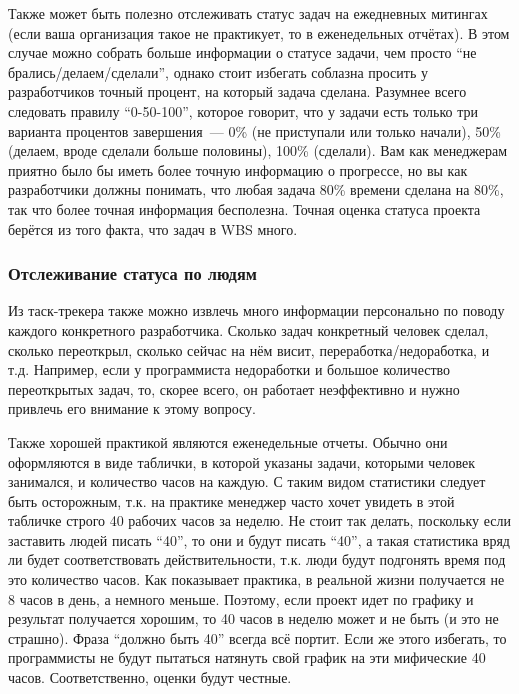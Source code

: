 \documentclass{../../text-style}
\begin{document}
Также может быть полезно отслеживать статус задач на ежедневных митингах (если ваша организация такое не практикует, то в еженедельных отчётах). В этом случае можно собрать больше информации о статусе задачи, чем просто \enquote{не брались/делаем/сделали}, однако стоит избегать соблазна просить у разработчиков точный процент, на который задача сделана. Разумнее всего следовать правилу \enquote{0-50-100}, которое говорит, что у задачи есть только три варианта процентов завершения~--- 0\% (не приступали или только начали), 50\% (делаем, вроде сделали больше половины), 100\% (сделали). Вам как менеджерам приятно было бы иметь более точную информацию о прогрессе, но вы как разработчики должны понимать, что любая задача 80\%  времени сделана на 80\%, так что более точная информация бесполезна. Точная оценка статуса проекта берётся из того факта, что задач в WBS много.

\subsubsection{Отслеживание статуса по людям}

Из таск-трекера также можно извлечь много информации персонально по поводу каждого конкретного разработчика. Сколько задач конкретный человек сделал, сколько переоткрыл, сколько сейчас на нём висит, переработка/недоработка, и т.д. Например, если у программиста недоработки и большое количество переоткрытых задач, то, скорее всего, он работает неэффективно и нужно привлечь его внимание к этому вопросу.

Также хорошей практикой являются еженедельные отчеты. Обычно они оформляются в виде таблички, в которой указаны задачи, которыми человек занимался, и количество часов на каждую. С таким видом статистики следует быть осторожным, т.к. на практике менеджер часто хочет увидеть в этой табличке строго 40 рабочих часов за неделю. Не стоит так делать, поскольку если заставить людей писать \enquote{40}, то они и будут писать \enquote{40}, а такая статистика вряд ли будет соответствовать действительности, т.к. люди будут подгонять время под это количество часов. Как показывает практика, в реальной жизни получается не 8 часов в день, а немного меньше. Поэтому, если проект идет по графику и результат получается хорошим, то 40 часов в неделю может и не быть (и это не страшно). Фраза \enquote{должно быть 40} всегда всё портит. Если же этого избегать, то программисты не будут пытаться натянуть свой график на эти мифические 40 часов. Соответственно, оценки будут честные.
\end{document}
